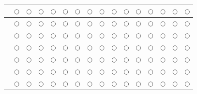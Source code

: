 \documentclass{article}
\begin{document}
\begin{center}
\begin{longtable}{ |p{6cm}|c|c|c|c|c|c|c|c|c|c|c|c|c|c|c|}
&$\bigcirc$&$\bigcirc$
&$\bigcirc$&$\bigcirc$&$\bigcirc$&$\bigcirc$&$\bigcirc$&$\bigcirc$&$\bigcirc$&$\bigcirc$&$\bigcirc$&$\bigcirc$&$\bigcirc$&$\bigcirc$&$\bigcirc$\\
\hline

&$\bigcirc$&$\bigcirc$
&$\bigcirc$&$\bigcirc$&$\bigcirc$&$\bigcirc$&$\bigcirc$&$\bigcirc$&$\bigcirc$&$\bigcirc$&$\bigcirc$&$\bigcirc$&$\bigcirc$&$\bigcirc$&$\bigcirc$\\
\hline

&$\bigcirc$&$\bigcirc$
&$\bigcirc$&$\bigcirc$&$\bigcirc$&$\bigcirc$&$\bigcirc$&$\bigcirc$&$\bigcirc$&$\bigcirc$&$\bigcirc$&$\bigcirc$&$\bigcirc$&$\bigcirc$&$\bigcirc$\\
\hline

&$\bigcirc$&$\bigcirc$
&$\bigcirc$&$\bigcirc$&$\bigcirc$&$\bigcirc$&$\bigcirc$&$\bigcirc$&$\bigcirc$&$\bigcirc$&$\bigcirc$&$\bigcirc$&$\bigcirc$&$\bigcirc$&$\bigcirc$\\
\hline

&$\bigcirc$&$\bigcirc$
&$\bigcirc$&$\bigcirc$&$\bigcirc$&$\bigcirc$&$\bigcirc$&$\bigcirc$&$\bigcirc$&$\bigcirc$&$\bigcirc$&$\bigcirc$&$\bigcirc$&$\bigcirc$&$\bigcirc$\\
\hline

&$\bigcirc$&$\bigcirc$
&$\bigcirc$&$\bigcirc$&$\bigcirc$&$\bigcirc$&$\bigcirc$&$\bigcirc$&$\bigcirc$&$\bigcirc$&$\bigcirc$&$\bigcirc$&$\bigcirc$&$\bigcirc$&$\bigcirc$\\
\hline
&$\bigcirc$&$\bigcirc$
&$\bigcirc$&$\bigcirc$&$\bigcirc$&$\bigcirc$&$\bigcirc$&$\bigcirc$&$\bigcirc$&$\bigcirc$&$\bigcirc$&$\bigcirc$&$\bigcirc$&$\bigcirc$&$\bigcirc$\\
\hline
\end{longtable}
\end{center}
\end{document}
